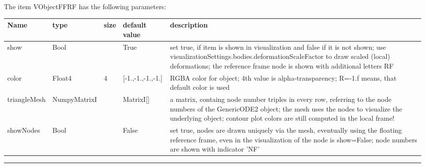 The item VObjectFFRF has the following parameters:\vspace{-1cm}\\ 
\begin{center}
  \footnotesize
  \begin{longtable}{| p{4.5cm} | p{2.5cm} | p{0.5cm} | p{2.5cm} | p{6cm} |}
    \hline
    \bf Name & \bf type & \bf size & \bf default value & \bf description \\ \hline
    show &     Bool &      &     True &     set true, if item is shown in visualization and false if it is not shown; use visualizationSettings.bodies.deformationScaleFactor to draw scaled (local) deformations; the reference frame node is shown with additional letters RF\\ \hline
    color &     Float4 &     4 &     [-1.,-1.,-1.,-1.] &     RGBA color for object; 4th value is alpha-transparency; R=-1.f means, that default color is used\\ \hline
    triangleMesh &     NumpyMatrixI &      &     MatrixI[] &     a matrix, containg node number triples in every row, referring to the node numbers of the GenericODE2 object; the mesh uses the nodes to visualize the underlying object; contour plot colors are still computed in the local frame!\\ \hline
    showNodes &     Bool &      &     False &     set true, nodes are drawn uniquely via the mesh, eventually using the floating reference frame, even in the visualization of the node is show=False; node numbers are shown with indicator 'NF'\\ \hline
	  \end{longtable}
	\end{center}
\par\noindent\rule{\textwidth}{0.4pt}
\label{description_ObjectFFRF}
